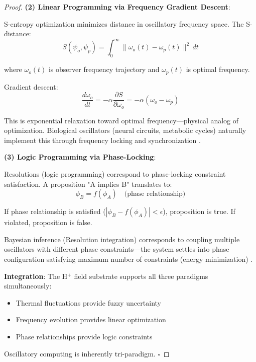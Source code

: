 \begin{proof}
\textbf{(2) Linear Programming via Frequency Gradient Descent}:

S-entropy optimization minimizes distance in oscillatory frequency space. The S-distance:
\begin{equation}
S(\psi_o, \psi_p) = \int_0^\infty \|\omega_o(t) - \omega_p(t)\|^2 \, dt
\end{equation}

where $\omega_o(t)$ is observer frequency trajectory and $\omega_p(t)$ is optimal frequency.

Gradient descent:
\begin{equation}
\frac{d\omega_o}{dt} = -\alpha \frac{\partial S}{\partial \omega_o} = -\alpha (\omega_o - \omega_p)
\end{equation}

This is exponential relaxation toward optimal frequency—physical analog of optimization. Biological oscillators (neural circuits, metabolic cycles) naturally implement this through frequency locking and synchronization \cite{pikovsky2001synchronization}.

\textbf{(3) Logic Programming via Phase-Locking}:

Resolutions (logic programming) correspond to phase-locking constraint satisfaction. A proposition "A implies B" translates to:
\begin{equation}
\phi_B = f(\phi_A) \quad \text{(phase relationship)}
\end{equation}

If phase relationship is satisfied ($|\phi_B - f(\phi_A)| < \epsilon$), proposition is true. If violated, proposition is false.

Bayesian inference (Resolution integration) corresponds to coupling multiple oscillators with different phase constraints—the system settles into phase configuration satisfying maximum number of constraints (energy minimization) \cite{hopfield1982neural}.

\textbf{Integration}: The H\(^+\) field substrate supports all three paradigms simultaneously:
\begin{itemize}
\item Thermal fluctuations provide fuzzy uncertainty
\item Frequency evolution provides linear optimization
\item Phase relationships provide logic constraints
\end{itemize}

Oscillatory computing is inherently tri-paradigm. $\square$
\end{proof}

